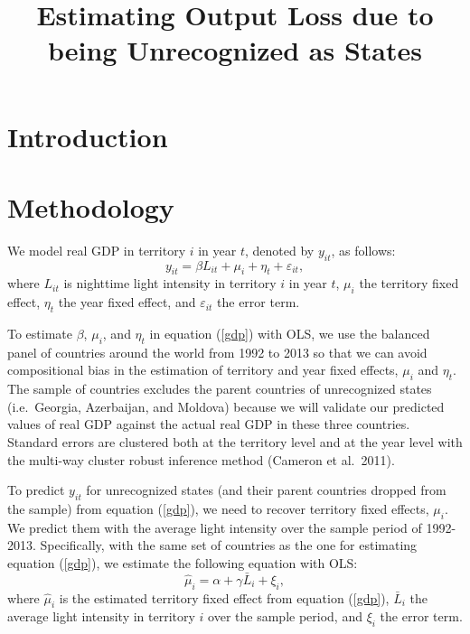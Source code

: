 \documentclass[12pt,a4paper]{article}%
\begin{document}
\title{Estimating Output Loss due to being Unrecognized as States}
\date{}
\maketitle

\section{Introduction}
\section{Methodology}
We model real GDP in territory $i$ in year $t$, denoted by $y_{it}$, as follows:
\begin{equation}\label{gdp}
y_{it} = \beta L_{it} + \mu_i + \eta_t + \varepsilon_{it},
\end{equation}
where $L_{it}$ is nighttime light intensity in territory $i$ in year $t$, $\mu_i$ the territory fixed effect, $\eta_t$ the year fixed effect, and $\varepsilon_{it}$ the error term.

To estimate $\beta$, $\mu_i$, and $\eta_t$ in equation (\ref{gdp}) with OLS, we use the balanced panel of countries around the world from 1992 to 2013 so that we can avoid compositional bias in the estimation of territory and year fixed effects, $\mu_i$ and $\eta_t$. 
The sample of countries excludes the parent countries of unrecognized states (i.e.\ Georgia, Azerbaijan, and Moldova) because we will validate our predicted values of real GDP against the actual real GDP in these three countries.
Standard errors are clustered both at the territory level and at the year level with the multi-way cluster robust inference method (Cameron et al.\ 2011).

To predict $y_{it}$ for unrecognized states (and their parent countries dropped from the sample) from equation (\ref{gdp}), we need to recover territory fixed effects, $\mu_i$. 
We predict them with the average light intensity over the sample period of 1992-2013. 
Specifically, with the same set of countries as the one for estimating equation (\ref{gdp}), we estimate the following equation with OLS:
\begin{equation}\label{country_fe}
\hat{\mu}_i = \alpha + \gamma \bar{L}_{i} + \xi_{i},
\end{equation}
where $\hat{\mu}_i$ is the estimated territory fixed effect from equation (\ref{gdp}), $\bar{L}_{i}$ the average light intensity in territory $i$ over the sample period, and $\xi_i$ the error term.
\end{document}

